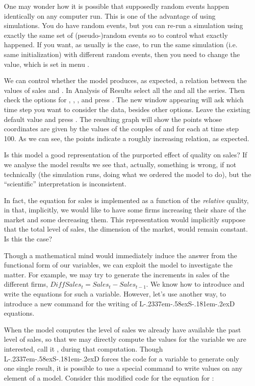 \documentclass [11pt,a4paper] {book}
\def\LsD{{L\kern-.2337em\lower-.58ex\hbox{S}\kern-.181em\lower-.2ex\hbox{D}}\xspace}
\begin{document}
One may wonder how it is possible that supposedly random events happen identically on any
computer run. This is one of the advantage of using simulations. You do have random
events, but you can re-run a simulation using exactly the same set of (pseudo-)random
events so to control what exactly happened. If you want, as usually is the case, to run
the same simulation (i.e. same initialization) with different random events, then you
need to change the  value, which is set in menu .

We can control whether the model produces, as expected, a relation between the values of sales and . In Analysis of Results select all the  and all the
 series. Then check the options for , , , and
press . The new window appearing will ask which time step you want to consider the data, besides other options. Leave the existing default value and press . The resulting graph will show the points whose coordinates are given by the values of the couples of  and  for each  at time step 100. As we can see, the points indicate a roughly increasing relation, as expected.

Is this model a good representation of the purported effect of quality on sales? If we analyse the model results we see that, actually, something is wrong, if not technically (the simulation runs, doing what we ordered the model to do), but the ``scientific'' interpretation is inconsistent.

In fact, the equation for sales is implemented as a function of the \textit{relative} quality, in that, implicitly, we would like to have some firms increasing their share of the market and some decreasing them. This representation would implicitly suppose that the total level of sales, the dimension of the market, would remain constant. Is this the case?

Though a mathematical mind would immediately induce the answer from the functional form of our variables, we can exploit the model to investigate the matter. For example, we may try to generate the increments in sales of the different firms, $DiffSales_t=Sales_t-Sales_{t-1}$. We know how to introduce and write the equations for such a variable. However, let's use another way, to introduce a new command for the writing of \LsD equations.

When the model computes the level of sales we already have available the past level of sales, so that we may directly compute the values for the variable we are interested, call it , during that computation. Though \LsD forces the code for a variable to generate only one single result, it is possible to use a special command to write values on any element of a model. Consider this modified code for the equation for :
\end{document}
